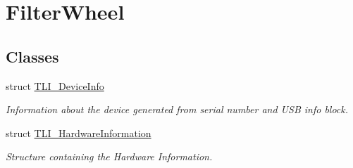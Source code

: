 \hypertarget{group___filter_wheel}{}\section{Filter\+Wheel}
\label{group___filter_wheel}
\subsection*{Classes}
\begin{DoxyCompactItemize}
\item 
struct \hyperlink{struct_t_l_i___device_info}{T\+L\+I\+\_\+\+Device\+Info}
\begin{DoxyCompactList}\small\item\em Information about the device generated from serial number and U\+SB info block. \end{DoxyCompactList}\item 
struct \hyperlink{struct_t_l_i___hardware_information}{T\+L\+I\+\_\+\+Hardware\+Information}
\begin{DoxyCompactList}\small\item\em Structure containing the Hardware Information. \end{DoxyCompactList}\end{DoxyCompactItemize}
